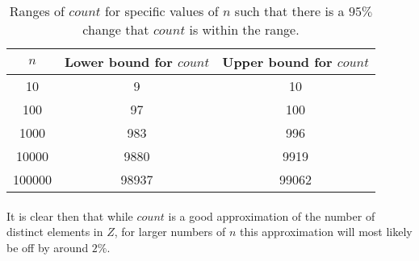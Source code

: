 \documentclass[../main.tex]{subfiles}
\begin{document}
\begin{table}[h!]
  \centering
  \begin{center}
  \begin{tabular}{| c | c | c |}
    \hline
    \(n\) & Lower bound for \(count\) & Upper bound for \(count\) \\ 
    \hline
    10 & 9 & 10 \\ 
    100 & 97 & 100 \\ 
    1000 & 983 & 996 \\ 
    10000 & 9880 & 9919 \\ 
    100000 & 98937 & 99062 \\ 
    \hline
  \end{tabular}
  \end{center}

\caption{Ranges of \(count\) for specific values of \(n\) such that there is a \(95\%\) change that \(count\) is within the range.}
\label{tab:ex1}
\end{table}

\paragraph{} It is clear then that while \(count\) is a good approximation of the number of distinct elements in \(Z\), for larger numbers of \(n\) this approximation will most likely be off by around \(2\%\). 
\end{document}
